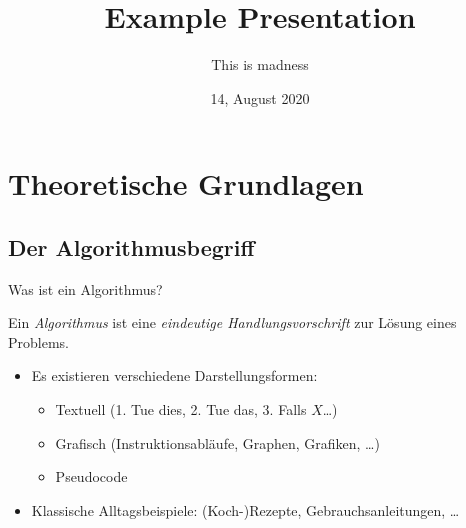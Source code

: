 \documentclass[aspectratio=169,usepdftitle=true,t]{beamer}
\title{Example Presentation}
\subtitle{This is madness}
\institute{Cute-Dispute-Institute \(\circ\) University Ulm}
\date{14, August 2020}
\begin{document}
\Intro

\section{Theoretische Grundlagen}
\subsection{Der Algorithmusbegriff}
\begin{frame}{Was ist ein Algorithmus?}
    \begin{definition}[Algorithmus]
        Ein \emph{Algorithmus} ist eine \emph{eindeutige Handlungsvorschrift} zur Lösung eines Problems.
    \end{definition}
    \begin{itemize}
        \item Es existieren verschiedene Darstellungsformen: \begin{itemize}
            \item Textuell (1. Tue dies, 2. Tue das, 3. Falls \(X\)\ldots)
            \item Grafisch (Instruktionsabläufe, Graphen, Grafiken, \ldots)
            \item Pseudocode
        \end{itemize}
        \item Klassische Alltagsbeispiele: (Koch-)Rezepte, Gebrauchsanleitungen, \ldots
    \end{itemize}
\end{frame}
\end{document}

